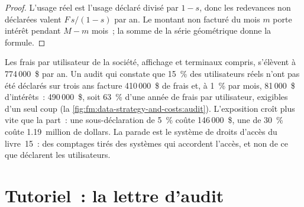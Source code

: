 \begin{proof}
L'usage réel est l'usage déclaré divisé par $1-s$, donc les redevances non déclarées valent $F\,s/(1-s)$ par an. Le montant non facturé du mois $m$ porte intérêt pendant
$M-m$ mois~; la somme de la série géométrique donne la formule.
\end{proof}

Les frais par utilisateur de la société, affichage et terminaux compris, s'élèvent à 774\,000~\$ par an. Un audit qui constate que 15~\% des utilisateurs réels n'ont pas été déclarés sur trois ans facture
410\,000~\$ de frais et, à 1~\% par mois, 81\,000~\$ d'intérêts~: 490\,000~\$, soit 63~\% d'une année de frais par utilisateur, exigibles d'un seul coup
(la \cref{fig:fm:data-strategy-and-costs:audit}). L'exposition croît plus vite que la part~: une sous-déclaration de 5~\% coûte 146\,000~\$, une de 30~\% coûte
1.19~million de dollars. La parade est le système de droits d'accès du livre~15~: des comptages tirés des systèmes qui accordent l'accès, et non de ce que déclarent les utilisateurs.

\begin{omfigure}

\label{fig:fm:data-strategy-and-costs:audit}
\end{omfigure}

\section{Tutoriel~: la lettre d'audit}\label{tut:fm:data-strategy-and-costs:tut}

